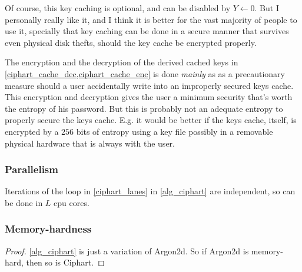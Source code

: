 \documentclass[twocolumn]{article}
\begin{document}
Of course, this key caching is optional, and can be disabled by $Y \gets
0$.  But I personally really like it, and I think it is better for the vast
majority of people to use it, specially that key caching can be done in a
secure manner that survives even physical disk thefts, should the key cache
be encrypted properly.

The encryption and the decryption of the derived cached keys in
\cref{ciphart_cache_dec,ciphart_cache_enc} is done \emph{mainly} as as a
precautionary measure should a user accidentally write into an improperly
secured keys cache.  This encryption and decryption gives the user a
minimum security that's worth the entropy of his password.  But this is
probably not an adequate entropy to properly secure the keys cache.  E.g.
it would be better if the keys cache, itself, is encrypted by a $256$ bits
of entropy using a key file possibly in a removable physical hardware that
is always with the user.

\subsubsection{Parallelism}
Iterations of the loop in \cref{ciphart_lanes} in \cref{alg_ciphart}
are independent, so can be done in $L$ cpu cores.

\subsubsection{Memory-hardness}
\begin{proof}
    \cref{alg_ciphart} is just a variation of Argon2d.  So if
    Argon2d is memory-hard, then so is Ciphart.
\end{proof}
\end{document}
